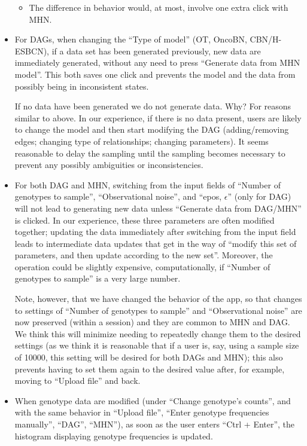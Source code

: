 \documentclass[a4paper,11pt]{article}
\begin{document}
\begin{itemize}
\begin{itemize}
  \item The difference in behavior would, at most, involve one extra click with MHN.
  \end{itemize}


\item For DAGs, when changing the ``Type of model'' (OT, OncoBN, CBN/H-ESBCN), if a data set has been generated previously, new data are immediately generated, without any need to press ``Generate data from MHN model''. This both saves one click and prevents the model and the data from possibly being in inconsistent states.

  If no data have been generated we do not generate data. Why? For reasons similar to above. In our experience, if there is no data present, users are likely to change the model and then start modifying the DAG (adding/removing edges; changing type of relationships; changing parameters). It seems reasonable to delay the sampling until the sampling becomes necessary to prevent any possibly ambiguities or inconsistencies.

  
\item For both DAG and MHN, switching from the input fields of ``Number of genotypes to sample'', ``Observational noise'', and ``epos, $\epsilon$'' (only for DAG) will not lead to generating new data unless ``Generate data from DAG/MHN'' is clicked. In our experience, these three parameters are often modified together; updating the data immediately after switching from the input field leads to intermediate data updates that get in the way of ``modify this set of parameters, and then update according to the new set''. Moreover, the operation could be slightly expensive, computationally, if ``Number of genotypes to sample'' is a very large number.
  

Note, however, that we have changed the behavior of the app, so that changes to settings of ``Number of genotypes to sample'' and ``Observational noise'' are now preserved (within a session) and they are common to MHN and DAG. We think this will minimize needing to repeatedly change them to the desired settings (as we think it is reasonable that if a user is, say, using a sample size of 10000, this setting will be desired for both DAGs and MHN); this also prevents having to set them again to the desired value after, for example, moving to ``Upload file'' and back.

  
\item When genotype data are modified (under ``Change genotype's counts'', and with the same behavior in ``Upload file'', ``Enter genotype frequencies manually'', ``DAG'', ``MHN''), as soon as the user enters ``Ctrl + Enter'', the histogram displaying genotype frequencies is updated.


\end{itemize}
\end{document}
